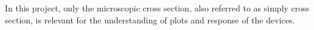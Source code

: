 In this project, only the microscopic cross section, also referred to as simply cross section, is relevant for the understanding of plots and response of the devices.






